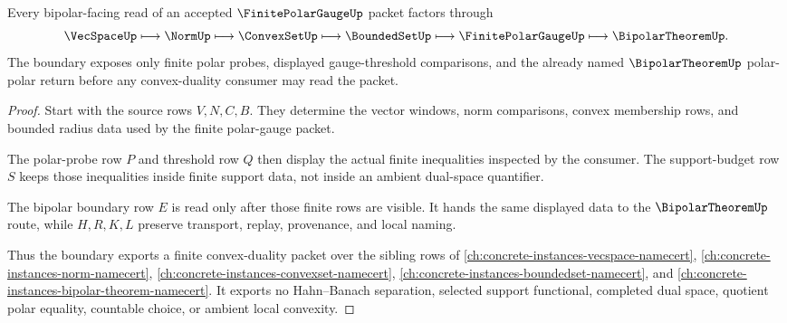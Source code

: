 \begin{theorem}
\label{thm:finite-polar-gauge-bipolar-boundary}
Every bipolar-facing read of an accepted $\FinitePolarGaugeUp$ packet factors through
$$
\VecSpaceUp \longmapsto \NormUp \longmapsto \ConvexSetUp \longmapsto \BoundedSetUp \longmapsto \FinitePolarGaugeUp \longmapsto \BipolarTheoremUp .
$$
The boundary exposes only finite polar probes, displayed gauge-threshold comparisons, and the already named $\BipolarTheoremUp$ polar-polar return before any convex-duality consumer may read the packet.
\end{theorem}
\begin{proof}
Start with the source rows $V,N,C,B$. They determine the vector windows, norm comparisons, convex membership rows, and bounded radius data used by the finite polar-gauge packet.

The polar-probe row $P$ and threshold row $Q$ then display the actual finite inequalities inspected by the consumer. The support-budget row $S$ keeps those inequalities inside finite support data, not inside an ambient dual-space quantifier.

The bipolar boundary row $E$ is read only after those finite rows are visible. It hands the same displayed data to the $\BipolarTheoremUp$ route, while $H,R,K,L$ preserve transport, replay, provenance, and local naming.

Thus the boundary exports a finite convex-duality packet over the sibling rows of \autoref{ch:concrete-instances-vecspace-namecert}, \autoref{ch:concrete-instances-norm-namecert}, \autoref{ch:concrete-instances-convexset-namecert}, \autoref{ch:concrete-instances-boundedset-namecert}, and \autoref{ch:concrete-instances-bipolar-theorem-namecert}. It exports no Hahn--Banach separation, selected support functional, completed dual space, quotient polar equality, countable choice, or ambient local convexity.
\end{proof}


